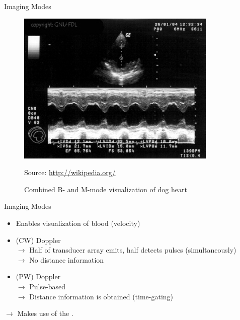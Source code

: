 \begin{frame}{Imaging Modes \cont}


    \begin{figure}
        \centering
        \includegraphics[height=0.7\textheight]{images/m-mode_example.png}
        \caption{\normalsize Combined B- and M-mode visualization of dog heart}
        \vspace{-0.5cm}
        \begin{flushright}
            \tiny  Source: \url{http://wikipedia.org/}
        \end{flushright}
    \end{figure}
\end{frame}


\begin{frame}{Imaging Modes \cont}

    \vspace{0.3cm}
    \begin{itemize}
        \setlength\itemsep{0.3cm}
        \item Enables visualization of blood  (velocity)
        \item {} (CW) Doppler\\
              $\rightarrow$ Half of transducer array emits, half detects pulses (simultaneously)\\
              $\rightarrow$ No distance information
        \item {} (PW) Doppler\\
              $\rightarrow$ Pulse-based\\
              $\rightarrow$ Distance information is obtained (time-gating)
    \end{itemize}

    \vspace{1cm}
    $\rightarrow$ Makes use of the .
\end{frame}


